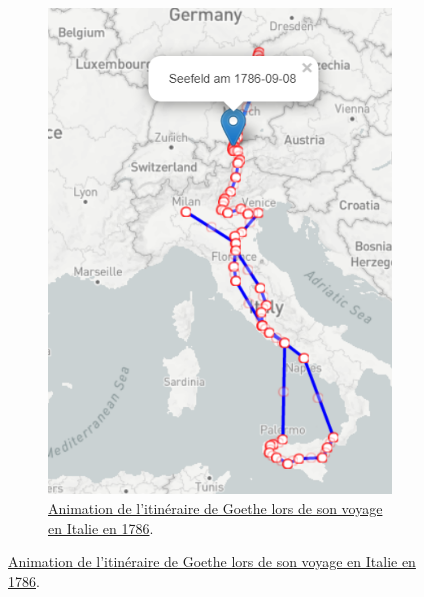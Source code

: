 \documentclass[a4paper, 12pt, twoside]{book}
\begin{document}
\begin{figure}[h!]
\begin{subfigure}[b]{0.4\textwidth}
         \includegraphics[height=1.4\textwidth]{img/chronotopographie/chronoto_reise_goethe.png}
         \caption{\href{https://telotawebdev.bbaw.de/avhr/reisetagebuecher?reise=goethe_italien&dist=90&days=500}{Animation de l'itinéraire de Goethe lors de son voyage en Italie en 1786}.}
        \end{subfigure}
\end{figure}
\end{document}
